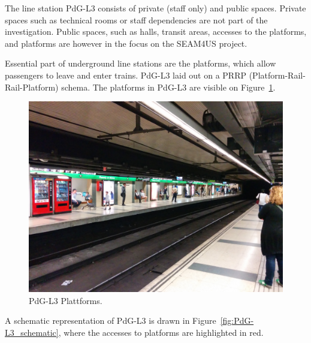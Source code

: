 The line station PdG-L3 consists of private (staff only) and public spaces. Private spaces such as technical rooms or staff dependencies are not part of the investigation. Public spaces, such as halls, transit areas, accesses to the platforms, and platforms are however in the focus on the SEAM4US project.

Essential part of underground line stations are the platforms, which allow passengers to leave and enter trains. PdG-L3 laid out on a PRRP (Platform-Rail-Rail-Platform) schema. The platforms in PdG-L3 are visible on Figure~\ref{fig:PdG-L3_platforms}.

\begin{figure}[htb]
  \centering
  \includegraphics[width=\linewidth]{Figures/PdG-L3_platform.jpg} 
  \caption{PdG-L3 Plattforms. \cite{TMB_2014}}
  \label{fig:PdG-L3_platforms}
\end{figure}



A schematic representation of PdG-L3 is drawn in Figure~\ref{fig:PdG-L3_schematic}, where the accesses to platforms are highlighted in red.

